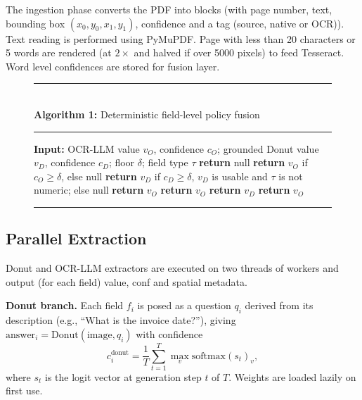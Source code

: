 \documentclass[conference]{IEEEtran}
\begin{document}
The ingestion phase converts the PDF into blocks (with page number, text, bounding box $(x_0,y_0,x_1,y_1)$, confidence and a tag (source, native or OCR)). Text reading is performed using PyMuPDF. Page with less than 20 characters or 5 words are rendered (at $2\times$ and halved if over 5000 pixels) to feed Tesseract. Word level confidences are stored for fusion layer.

\begin{figure}[t]
\noindent\rule{\columnwidth}{0.6pt}\\
\noindent\textbf{Algorithm 1:} Deterministic field-level policy fusion\\[-4pt]
\noindent\rule{\columnwidth}{0.4pt}
\begin{algorithmic}[1]
\STATE \textbf{Input:} OCR-LLM value $v_O$, confidence $c_O$; grounded Donut value $v_D$, confidence $c_D$; floor $\delta$; field type $\tau$
    \STATE \textbf{return} null
    \STATE \textbf{return} $v_O$ if $c_O \geq \delta$, else null
    \STATE \textbf{return} $v_D$ if $c_D \geq \delta$, $v_D$ is usable and $\tau$ is not numeric; else null
    \STATE \textbf{return} $v_O$ 
    \STATE \textbf{return} $v_O$
    \STATE \textbf{return} $v_D$ 
\ELSE
    \STATE \textbf{return} $v_O$ 
\ENDIF
\end{algorithmic}
\vspace{-4pt}
\noindent\rule{\columnwidth}{0.4pt}
\end{figure}

\subsection{Parallel Extraction}

Donut and OCR-LLM extractors are executed on two threads of workers and output (for each field) value, conf and spatial metadata.

\textbf{Donut branch.} Each field $f_i$ is posed as a question $q_i$ derived from its description (e.g., ``What is the invoice date?''), giving $\text{answer}_i = \text{Donut}(\text{image}, q_i)$ with confidence
\begin{equation}
    c_i^{\text{donut}} = \frac{1}{T} \sum_{t=1}^{T}
    \max_{v} \text{softmax}(s_t)_v ,
    \label{eq:donut_conf}
\end{equation}
where $s_t$ is the logit vector at generation step $t$ of $T$. Weights are loaded lazily on first use.
\end{document}
